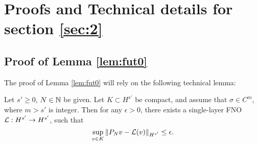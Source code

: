 \documentclass[reqno,a4paper]{amsart}
\begin{document}
\section{Proofs and Technical details for section \ref{sec:2}}

\subsection{
Proof of Lemma \ref{lem:fut0}
}
\label{app:pfut0}


The proof of Lemma \ref{lem:fut0} will rely on the following technical lemma:

\begin{lemma}\label{lem:proj-layer}
Let $s'\ge 0$, $N\in \mathbb{N}$ be given. Let $K\subset H^{s'}$ be compact, and assume that $\sigma\in C^m$, where $m>s'$ is integer. Then for any $\epsilon > 0$, there exists a single-layer FNO $\mathcal{L}: H^{s'} \to H^{s'}$, such that
\[
\sup_{v\in K} \Vert P_N v - \mathcal{L}(v) \Vert_{H^{s'}} \le \epsilon.
\] 
\end{lemma}
\end{document}
